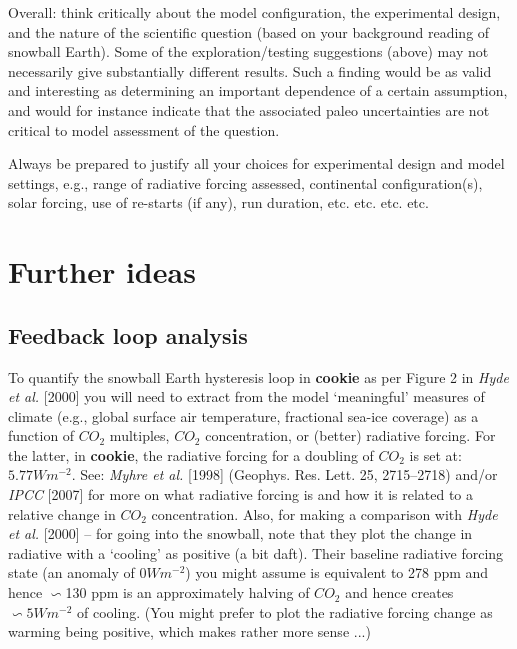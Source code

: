 Overall: think critically about the model configuration, the experimental design, and the nature of the scientific question (based on your background reading of snowball Earth). Some of the exploration/testing suggestions (above) may not necessarily give substantially different results. Such a finding would be as valid and interesting as determining an important dependence of a certain assumption, and would for instance indicate that the associated paleo uncertainties are not critical to model assessment of the question.

Always be prepared to justify all your choices for experimental design and model settings, e.g., range of radiative forcing assessed, continental configuration(s), solar forcing, use of re-starts (if any), run duration, etc. etc. etc. etc.

\newpage

\section{Further ideas}


\subsection{Feedback loop analysis}

To quantify the snowball Earth hysteresis loop in \textbf{cookie} as per Figure 2 in \textit{Hyde et al.} [2000] you will need to extract from the model ‘meaningful’ measures of climate (e.g., global surface air temperature, fractional sea-ice coverage) as a function of \(CO_{2}\) multiples, \(CO_{2}\) concentration, or (better) radiative forcing. For the latter, in \textbf{cookie}, the radiative forcing for a doubling of \(CO_{2}\) is set at: \(5.77 Wm^{-2}\). See: \textit{Myhre et al.} [1998] (Geophys. Res. Lett. 25, 2715–2718) and/or \textit{IPCC} [2007] for more on what radiative forcing is and how it is related to a relative change in \(CO_{2}\) concentration. Also, for making a comparison with \textit{Hyde et al.} [2000] -- for going into the snowball, note that they plot the change in radiative with a ‘cooling’ as positive (a bit daft). Their baseline radiative forcing state (an anomaly of \(0 Wm^{-2}\)) you might assume is equivalent to 278 ppm and hence \(\backsim\)130 ppm is an approximately halving of \(CO_{2}\) and hence creates \(\backsim5 Wm^{-2}\) of cooling. (You might prefer to plot the radiative forcing change as warming being positive, which makes rather more sense ...)

